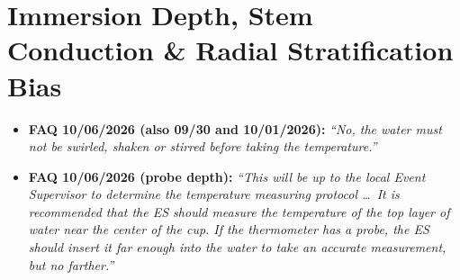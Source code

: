 \section{Immersion Depth, Stem Conduction \& Radial Stratification Bias}\label{sec:17.4}

\begin{rulebox}
\begin{itemize}
  \item \textbf{FAQ 10/06/2026 (also 09/30 and 10/01/2026):} \emph{``No, the water must not be swirled, shaken or stirred before taking the temperature.''}
  \item \textbf{FAQ 10/06/2026 (probe depth):} \emph{``This will be up to the local Event Supervisor to determine the temperature measuring protocol \ldots\ It is recommended that the ES should measure the temperature of the top layer of water near the center of the cup. If the thermometer has a probe, the ES should insert it far enough into the water to take an accurate measurement, but no farther.''}
\end{itemize}
\end{rulebox}

